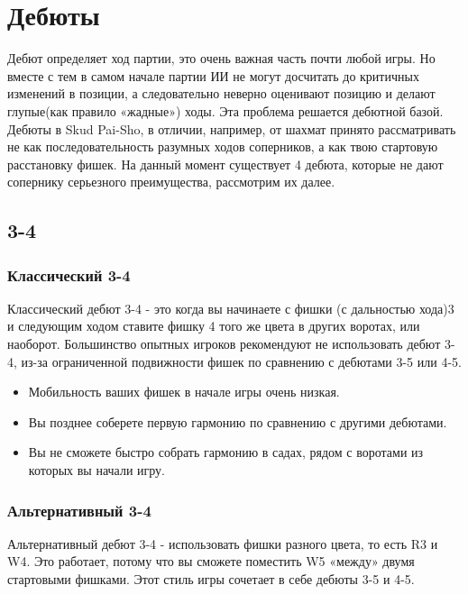 \documentclass[a4paper,12pt]{diplom}
\begin{document}
\chapter{Дебюты}

Дебют определяет ход партии, это очень важная часть почти любой игры. Но вместе с тем в самом начале партии ИИ не могут досчитать до критичных изменений в позиции, а следовательно неверно оценивают позицию и делают глупые(как правило «жадные») ходы. Эта проблема решается дебютной базой. Дебюты в Skud Pai-Sho, в отличии, например, от шахмат принято рассматривать не как последовательность разумных ходов соперников, а как твою стартовую расстановку фишек. На данный момент существует 4 дебюта, которые не дают сопернику серьезного преимущества, рассмотрим их далее.

\section{3-4}

\subsection{Классический 3-4}

Классический дебют 3-4 - это когда вы начинаете с фишки (с дальностью хода)3 и следующим ходом ставите фишку 4 того же цвета в других воротах, или наоборот.
Большинство опытных игроков рекомендуют не использовать дебют 3-4, из-за ограниченной подвижности фишек по сравнению с дебютами 3-5 или 4-5.

\begin{itemize}
	\item Мобильность ваших фишек в начале игры очень низкая.
	\item Вы позднее соберете первую гармонию по сравнению с другими дебютами.
	\item Вы не сможете быстро собрать гармонию в садах, рядом с воротами из которых вы начали игру.
\end{itemize}

\subsection{Альтернативный 3-4}

Альтернативный дебют 3-4 - использовать фишки разного цвета, то есть R3 и W4. Это работает, потому что вы сможете поместить W5 «между» двумя стартовыми фишками. Этот стиль игры сочетает в себе дебюты 3-5 и 4-5.
\end{document}

